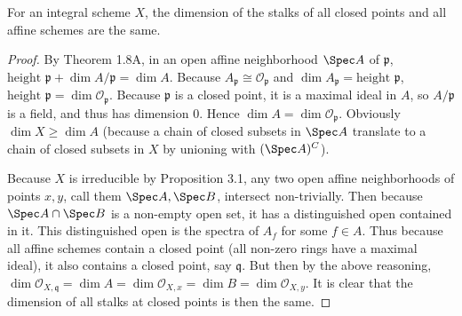 \begin{lem}\label{lem:stalk_dim}
	For an integral scheme $X $, the dimension of the stalks of all closed points and all affine schemes are the same.
\end{lem}
\begin{proof}
	By Theorem 1.8A, in an open affine neighborhood $\Spec A $ of $\mathfrak{p} $, $\text{height }\mathfrak{p} + \dim A / \mathfrak{p} = \dim A $.
	Because $A_{\mathfrak{p}} \cong \mathcal{O}_{\mathfrak{p}}$ and $\dim A_{\mathfrak{p}} = \text{height }\mathfrak{p} $, $\text{height }\mathfrak{p} = \dim \mathcal{O}_{\mathfrak{p}} $.
	Because $\mathfrak{p} $ is a closed point, it is a maximal ideal in $A $, so $A / \mathfrak{p} $ is a field, and thus has dimension 0.
	Hence $\dim A = \dim \mathcal{O}_{\mathfrak{p}} $.
	Obviously $\dim X \ge \dim A $ (because a chain of closed subsets in $\Spec A $ translate to a chain of closed subsets in $X $ by unioning with $(\Spec A)^C $).

	Because $ X$ is irreducible by Proposition 3.1, any two open affine neighborhoods of points $x,y $, call them $\Spec A, \Spec B $, intersect non-trivially.
	Then because $\Spec A \cap \Spec B $ is a non-empty open set, it has a distinguished open contained in it.
	This distinguished open is the spectra of $A_f $ for some $f\in A $.
	Thus because all affine schemes contain a closed point (all non-zero rings have a maximal ideal), it also contains a closed point, say $\mathfrak{q} $.
	But then by the above reasoning, $\dim \mathcal{O}_{X,\mathfrak{q}} = \dim A = \dim \mathcal{O}_{X,x} = \dim B = \dim \mathcal{O}_{X,y}$.
	It is clear that the dimension of all stalks at closed points is then the same.
\end{proof}

